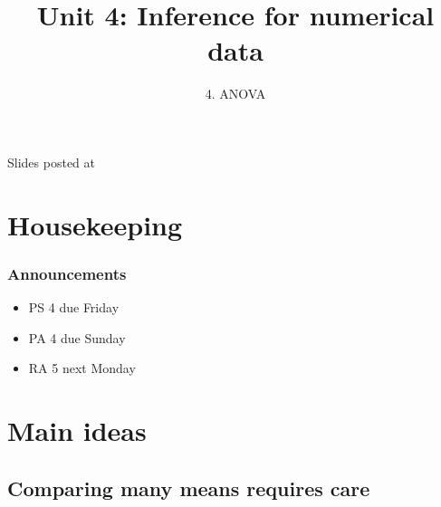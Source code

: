 \documentclass[11pt,containsverbatim,handout,xcolor=xelatex,dvipsnames,table]{beamer}
\title{Unit 4: Inference for numerical data}
\subtitle{4. ANOVA}
\author{\CourseName}
\date{}
\institute{\InstituteName}
\begin{document}



\begin{frame}[plain]

\titlepage

\vfill

{\scriptsize {} \hfill Slides posted at  \webURL{\CourseSite}}

\addtocounter{framenumber}{-1} 

\end{frame}


\section{Housekeeping}


\begin{frame}
\frametitle{Announcements}

\begin{itemize}

\item PS 4 due Friday

\item PA 4 due Sunday

\item RA 5 next Monday

\end{itemize}

\end{frame}


\section{Main ideas}


\subsection{Comparing many means requires care}
\label{mi1}

\end{document}
